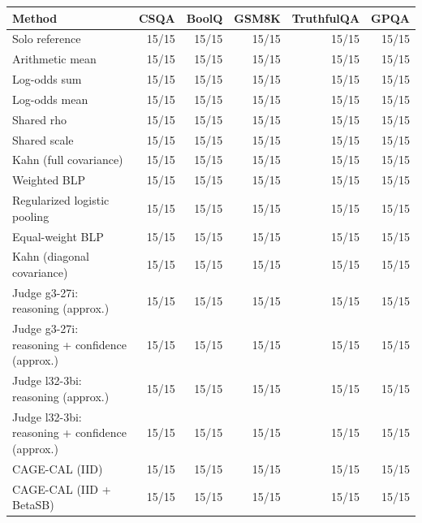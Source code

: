 \begin{tabular}{lrrrrr}
\toprule
Method & CSQA & BoolQ & GSM8K & TruthfulQA & GPQA \\
\midrule
Solo reference & 15/15 & 15/15 & 15/15 & 15/15 & 15/15 \\
Arithmetic mean & 15/15 & 15/15 & 15/15 & 15/15 & 15/15 \\
Log-odds sum & 15/15 & 15/15 & 15/15 & 15/15 & 15/15 \\
Log-odds mean & 15/15 & 15/15 & 15/15 & 15/15 & 15/15 \\
Shared rho & 15/15 & 15/15 & 15/15 & 15/15 & 15/15 \\
Shared scale & 15/15 & 15/15 & 15/15 & 15/15 & 15/15 \\
Kahn (full covariance) & 15/15 & 15/15 & 15/15 & 15/15 & 15/15 \\
Weighted BLP & 15/15 & 15/15 & 15/15 & 15/15 & 15/15 \\
Regularized logistic pooling & 15/15 & 15/15 & 15/15 & 15/15 & 15/15 \\
Equal-weight BLP & 15/15 & 15/15 & 15/15 & 15/15 & 15/15 \\
Kahn (diagonal covariance) & 15/15 & 15/15 & 15/15 & 15/15 & 15/15 \\
Judge g3-27i: reasoning (approx.) & 15/15 & 15/15 & 15/15 & 15/15 & 15/15 \\
Judge g3-27i: reasoning + confidence (approx.) & 15/15 & 15/15 & 15/15 & 15/15 & 15/15 \\
Judge l32-3bi: reasoning (approx.) & 15/15 & 15/15 & 15/15 & 15/15 & 15/15 \\
Judge l32-3bi: reasoning + confidence (approx.) & 15/15 & 15/15 & 15/15 & 15/15 & 15/15 \\
CAGE-CAL (IID) & 15/15 & 15/15 & 15/15 & 15/15 & 15/15 \\
CAGE-CAL (IID + BetaSB) & 15/15 & 15/15 & 15/15 & 15/15 & 15/15 \\
\bottomrule
\end{tabular}
